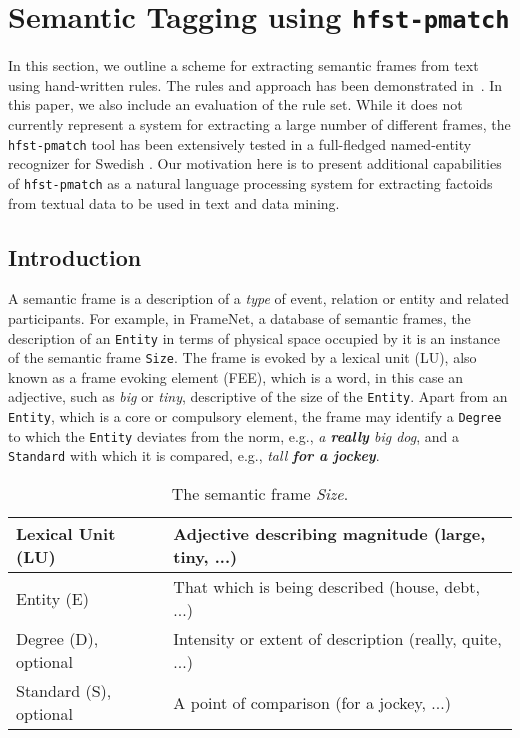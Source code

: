 \documentclass{llncs}
\begin{document}
\section{Semantic Tagging using {\tt hfst-pmatch}}\label{sec:sem-tagging}

In this section, we outline a scheme for extracting semantic frames from text
using hand-written rules. The rules and approach has been demonstrated in~\cite{hardwick/2015}. 
In this paper, we also include an evaluation of the rule set. While it does not currently 
represent a system for extracting a large number of different frames, 
the \verb+hfst-pmatch+ tool has been extensively tested in a full-fledged 
named-entity recognizer for Swedish \cite{Kokkinakis-Dimitrios2014-3}. 
Our motivation here is to present additional capabilities of 
\verb+hfst-pmatch+ as a natural language processing system for extracting 
factoids from textual data to be used in text and data mining.

\subsection{Introduction}

A semantic frame \cite{semantic-frame} is a description of a \emph{type} of event, relation or entity
and related participants. For example, in FrameNet, a database of semantic frames,
the description of an \verb+Entity+ in terms of physical space occupied by it is
an instance of the semantic frame \verb+Size+. The frame is evoked by
a lexical unit (LU), also known as a frame evoking element (FEE), which is a
word, in this case an adjective,
such as \emph{big} or \emph{tiny}, descriptive of the size of the \verb+Entity+.
Apart from an \verb+Entity+, which is a core or compulsory element, the
frame may identify a \verb+Degree+ to which the \verb+Entity+ deviates
from the norm, e.g., \emph{a \textbf{really} big dog}, and a \verb+Standard+ with
which it is compared, e.g., \emph{tall \textbf{for a jockey}}.

\begin{table}[h]
\begin{center}
  \begin{tabular}{ | l | l |}
\hline
Lexical Unit (LU) & Adjective describing magnitude (large, tiny, ...) \\
\hline
Entity (E) & That which is being described (house, debt, ...) \\
\hline
Degree (D), optional & Intensity or extent of description (really, quite, ...) \\
\hline
Standard (S), optional & A point of comparison (for a jockey, ...) \\
\hline
    \end{tabular}
    \caption{The semantic frame \emph{Size}.}
\end{center}
\end{table}
\end{document}
